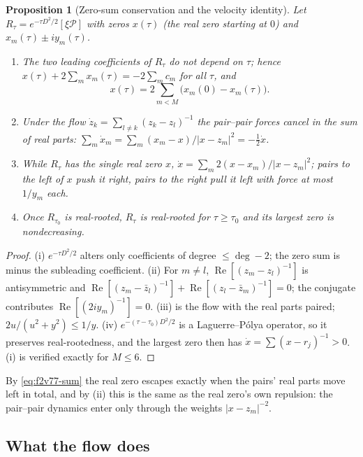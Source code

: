 \documentclass[11pt]{article}
\newtheorem{proposition}[theorem]{Proposition}
\theoremstyle{definition}
\theoremstyle{remark}
\begin{document}
\begin{proposition}[Zero-sum conservation and the velocity identity]
\label{prop:f2v77-invariants}
Let \(R_\tau=e^{-\tau D^2/2}[\xi\mathcal P]\) with zeros \(x(\tau)\) (the
real zero starting at \(0\)) and \(x_m(\tau)\pm iy_m(\tau)\).
\begin{enumerate}[label=\textup{(\roman*)}]
\item The two leading coefficients of \(R_\tau\) do not depend on
\(\tau\); hence \(x(\tau)+2\sum_mx_m(\tau)=-2\sum_mc_m\) for all
\(\tau\), and
\begin{equation}
 x(\tau)=2\sum_{m<M}\bigl(x_m(0)-x_m(\tau)\bigr).
 \label{eq:f2v77-sum}
\end{equation}
\item Under the flow \(\dot z_k=\sum_{l\ne k}(z_k-z_l)^{-1}\) the
pair--pair forces cancel in the sum of real parts:
\(\sum_m\dot x_m=\sum_m(x_m-x)/|x-z_m|^2=-\tfrac12\dot x\).
\item While \(R_\tau\) has the single real zero \(x\),
\(\dot x=\sum_m2(x-x_m)/|x-z_m|^2\); pairs to the left of \(x\) push it
right, pairs to the right pull it left with force at most \(1/y_m\) each.
\item Once \(R_{\tau_0}\) is real-rooted, \(R_\tau\) is real-rooted for
\(\tau\ge\tau_0\) and its largest zero is nondecreasing.
\end{enumerate}
\end{proposition}

\begin{proof}
(i) \(e^{-\tau D^2/2}\) alters only coefficients of degree \(\le\deg-2\);
the zero sum is minus the subleading coefficient.  (ii) For \(m\ne l\),
\(\operatorname{Re}[(z_m-z_l)^{-1}]\) is antisymmetric and
\(\operatorname{Re}[(z_m-\bar z_l)^{-1}]+\operatorname{Re}[(z_l-\bar z_m)^{-1}]=0\);
the conjugate contributes \(\operatorname{Re}[(2iy_m)^{-1}]=0\).  (iii)
is the flow with the real parts paired; \(2u/(u^2+y^2)\le1/y\).  (iv)
\(e^{-(\tau-\tau_0)D^2/2}\) is a Laguerre--Pólya operator, so it
preserves real-rootedness, and the largest zero then has
\(\dot x=\sum(x-r_j)^{-1}>0\).  (i) is verified exactly for \(M\le6\).
\end{proof}

By \eqref{eq:f2v77-sum} the real zero escapes exactly when the pairs'
real parts move left in total, and by (ii) this is the same as the real
zero's own repulsion: the pair--pair dynamics enter only through the
weights \(|x-z_m|^{-2}\).

\subsection{What the flow does}
\end{document}
